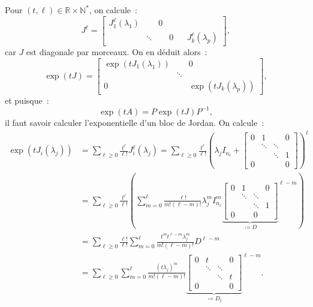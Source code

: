 \documentclass{report}
\theoremstyle{definition}
\theoremstyle{remark}
\numberwithin{equation}{section}
\newcommand{\R}{\mathbb R}
\newcommand{\N}{\mathbb N}
\newcommand{\Ns}{\N^{*}}
\begin{document}
			Pour $(t, \ell) \in \R \times \Ns$, on calcule~:
			\begin{equation}
				J^\ell =
			\begin{bmatrix}
				J_1^\ell(\lambda_1) & & 0 \\
				& \ddots & &
				0 & & J_k^\ell(\lambda_p)
			\end{bmatrix},
			\end{equation}
			car $J$ est diagonale par morceaux. On en déduit alors~:
			\begin{equation}
				\exp\left(tJ\right) =
			\begin{bmatrix}
				\exp\left(tJ_1(\lambda_1)\right) & & 0 \\
				& \ddots & \\
				0 & & \exp\left(tJ_k(\lambda_p)\right)
			\end{bmatrix},
			\end{equation}
			et puisque~:
			\begin{equation}
				\exp\left(tA\right) = P\exp\left(tJ\right)P^{-1},
			\end{equation}
			il faut savoir calculer l'exponentielle d'un bloc de Jordan. On calcule~:
			\begin{align}
				\exp\left(tJ_i(\lambda_j)\right) &= \sum_{\ell \geq 0}\frac {t^\ell}{\ell!}J_i^\ell(\lambda_j)
					= \sum_{\ell \geq 0}\frac {t^\ell}{\ell!}\left(\lambda_jI_{n_i} +
					\begin{bmatrix}
						0 & 1 & & 0 \\
						  & \ddots  & \ddots & \\
						  &  & \ddots & 1 \\
						0 & & & 0
					\end{bmatrix}\right)^\ell \\
				&= \sum_{\ell \geq 0}\frac {t^\ell}{\ell!}\left(\sum_{m = 0}^\ell\frac {\ell!}{m!(\ell-m)!}\lambda_j^mI_{n_i}^m
				{\underbrace{\begin{bmatrix}
					0 & 1 &  & 0 \\
					  & \ddots & \ddots & \\
					  & & \ddots & 1 \\
					0 & & 0
				\end{bmatrix}}_{\coloneqq D}}^{\ell-m}\right) \\
				&= \sum_{\ell \geq 0}\frac {\ell!}{\ell!}\sum_{m=0}^\ell\frac {t^mt^{\ell-m}\lambda_j^m}{m!(\ell-m)!}D^{\ell-m} \\
				&= \sum_{\ell \geq 0}\sum_{m=0}^\ell\frac {\left(t\lambda_j\right)^m}{m!(\ell-m)!}
				{\underbrace{\begin{bmatrix}
					0 & t & & 0 \\
					  &  \ddots & \ddots & \\
					  & & \ddots & t \\
					0 & & & 0
				\end{bmatrix}}_{\coloneqq D_t}}^{\ell-m}.
			\end{align}
\end{document}
